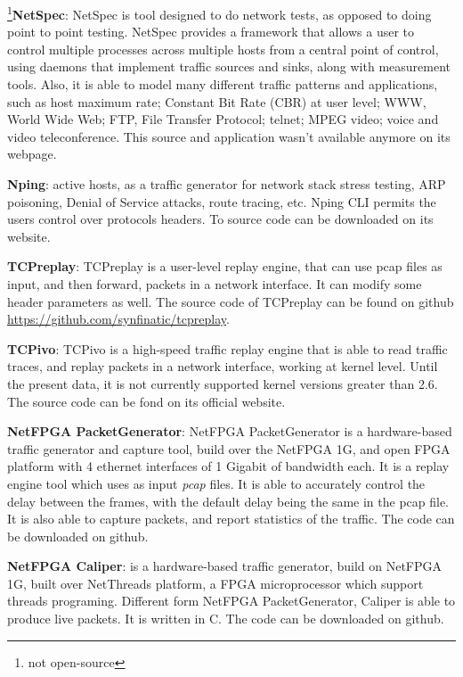 \footnote{not open-source}\textbf{NetSpec}\cite{web-netspec}: NetSpec is tool designed to do network tests, as opposed to doing point to point testing. NetSpec provides a framework that allows a user to control multiple processes across multiple hosts from a central point of control, using daemons that implement traffic sources and sinks, along with measurement tools. Also, it is able to model many different traffic patterns and applications, such as host maximum rate; Constant Bit Rate (CBR) at user level; WWW, World Wide Web; FTP, File Transfer Protocol; telnet; MPEG video; voice and video teleconference. This source and application wasn't available anymore on its webpage.


\textbf{Nping}\cite{web-nping}: active hosts, as a traffic generator for network stack stress testing, ARP poisoning, Denial of Service attacks, route tracing, etc. Nping CLI permits the users control over protocols headers. To source code can be downloaded on its website.


\textbf{TCPreplay}\cite{web-tcpreplay}: TCPreplay is a user-level replay engine, that can use pcap files as input, and then forward, packets in a network interface. It can modify some header parameters as well. The source code of TCPreplay can be found on github \href{https://github.com/synfinatic/tcpreplay}{https://github.com/synfinatic/tcpreplay}.


\textbf{TCPivo}\cite{tcpivo-paper}\cite{web-tcpivo}: TCPivo is a high-speed traffic replay engine that is able to read traffic traces, and replay packets in a network interface, working at kernel level. Until the present data, it is not currently supported kernel versions greater than 2.6. The source code can be fond on its official website.



\textbf{NetFPGA PacketGenerator}\cite{web-netfpgapacketgenerator}: NetFPGA PacketGenerator is a hardware-based traffic generator and capture tool, build over the NetFPGA 1G, and open FPGA platform with 4 ethernet interfaces of 1 Gigabit of bandwidth each. It is a replay engine tool which uses as input \textit{pcap} files. It is able to accurately control the delay between the frames, with the default delay being the same in the pcap file. It is also able to capture packets, and report statistics of the traffic. The code can be downloaded on github.


\textbf{NetFPGA Caliper}\cite{web-caliper}:  is a hardware-based traffic generator, build on NetFPGA 1G, built over NetThreads platform, a FPGA microprocessor which support threads programing. Different form NetFPGA PacketGenerator, Caliper is able to produce live packets. It is written in C.  The code can be downloaded on github.


